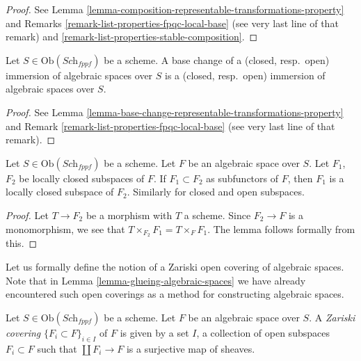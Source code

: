 \begin{proof}
See Lemma \ref{lemma-composition-representable-transformations-property} and
Remarks \ref{remark-list-properties-fpqc-local-base} (see very last line of
that remark) and \ref{remark-list-properties-stable-composition}.
\end{proof}

\begin{lemma}
\label{lemma-base-change-immersions}
Let $S \in \text{Ob}(\textit{Sch}_{fppf})$ be a scheme.
A base change of a (closed, resp.\ open) immersion
of algebraic spaces over $S$ is a (closed, resp.\ open)
immersion of algebraic spaces over $S$.
\end{lemma}

\begin{proof}
See Lemma \ref{lemma-base-change-representable-transformations-property} and
Remark \ref{remark-list-properties-fpqc-local-base} (see very last line of
that remark).
\end{proof}

\begin{lemma}
\label{lemma-sub-subspaces}
Let $S \in \text{Ob}(\textit{Sch}_{fppf})$ be a scheme.
Let $F$ be an algebraic space over $S$. Let $F_1$, $F_2$ be
locally closed subspaces of $F$. If $F_1 \subset F_2$ as subfunctors
of $F$, then $F_1$ is a locally closed subspace of $F_2$.
Similarly for closed and open subspaces.
\end{lemma}

\begin{proof}
Let $T \to F_2$ be a morphism with $T$ a scheme.
Since $F_2 \to F$ is a monomorphism, we see that
$T \times_{F_2} F_1 = T \times_F F_1$. The lemma follows
formally from this.
\end{proof}

\noindent
Let us formally define the notion of a Zariski open covering of
algebraic spaces. Note that in Lemma \ref{lemma-glueing-algebraic-spaces}
we have already encountered such open coverings as a method for
constructing algebraic spaces.

\begin{definition}
\label{definition-Zariski-open-covering}
Let $S \in \text{Ob}(\textit{Sch}_{fppf})$ be a scheme.
Let $F$ be an algebraic space over $S$.
A {\it Zariski covering} $\{F_i \subset F\}_{i \in I}$ of $F$
is given by a set $I$, a collection of open subspaces
$F_i \subset F$ such that $\coprod F_i \to F$ is a surjective
map of sheaves.
\end{definition}

